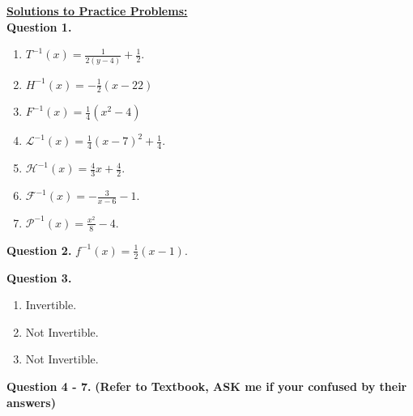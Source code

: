 \documentclass[12pt]{article} %
\begin{document}
\textbf{\underline{\Large{Solutions to Practice Problems:}}}\\
\textbf{Question 1.} \texttt{  }
  \begin{enumerate}[label=(\alph*)]
    \item $T^{-1}(x) = \frac{1}{2(y - 4)} + \frac{1}{2}$.
    \item $H^{-1}(x) = -\frac{1}{2}(x - 22)$
    \item $F^{-1}(x) = \frac{1}{4}(x^2 - 4)$
    \item $\mathcal{L}^{-1}(x) = \frac{1}{4}(x - 7)^2 + \frac{1}{4}$.
    \item $\mathcal{H}^{-1}(x) = \frac{4}{3}x + \frac{4}{2}$.
    \item $\mathcal{F}^{-1}(x) = -\frac{3}{x - 6} - 1$.
    \item $\mathcal{P}^{-1}(x) = \frac{x^2}{8} - 4$.
  \end{enumerate}


\textbf{Question 2.} $f^{-1}(x) = \frac{1}{2}(x - 1)$.


\textbf{Question 3.} \texttt{ }
\begin{enumerate}[label=(\alph*)]
  \item Invertible.
  \item Not Invertible.
  \item Not Invertible.
\end{enumerate}

\textbf{Question 4 - 7.} \textbf{(Refer to Textbook, ASK me if your confused by their answers)}
\end{document}
